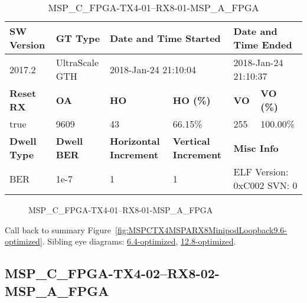 \begin{table}[h]
\centering
\caption{MSP\_C\_FPGA-TX4-01--RX8-01-MSP\_A\_FPGA}
\label{tab:MSPCFPGATX401RX801MSPAFPGA9.6-optimized}
\begin{tabular}{@{}|l|l|l|l|l|l|@{}}
\toprule
\textbf{SW Version}                & \textbf{GT Type}   & \multicolumn{2}{l|}{\textbf{Date and Time Started}}            & \multicolumn{2}{l|}{\textbf{Date and Time Ended}}        \\ \midrule
2017.2                       & UltraScale GTH          & \multicolumn{2}{l|}{2018-Jan-24 21:10:04}                   & \multicolumn{2}{l|}{2018-Jan-24 21:10:37}               \\ \midrule
\textbf{Reset RX}                  & \textbf{OA} & \textbf{HO}   & \textbf{HO (\%)} & \textbf{VO} & \textbf{VO (\%)} \\ \midrule
true & 9609        & 43          & 66.15\%        & 255        & 100.00\%       \\ \midrule
\textbf{Dwell Type}                & \textbf{Dwell BER} & \textbf{Horizontal Increment} & \textbf{Vertical Increment}    & \multicolumn{2}{l|}{\textbf{Misc Info}}                  \\ \midrule
BER                            & 1e-7        & 1        & 1           & \multicolumn{2}{l|}{ELF Version: 0xC002 SVN: 0}                         \\ \bottomrule
\end{tabular}
\end{table}

\begin{figure}[h]
\caption{MSP\_C\_FPGA-TX4-01--RX8-01-MSP\_A\_FPGA} \label{fig:MSPCFPGATX401RX801MSPAFPGA9.6-optimized}
\end{figure}

Call back to summary Figure~\ref{fig:MSPCTX4MSPARX8MinipodLoopback9.6-optimized}.
Sibling eye diagrams: \hyperref[sec:MSPCFPGATX401RX801MSPAFPGA6.4-optimized]{6.4-optimized}, \hyperref[sec:MSPCFPGATX401RX801MSPAFPGA12.8-optimized]{12.8-optimized}.

\clearpage
\newpage


\subsection{MSP\_C\_FPGA-TX4-02--RX8-02-MSP\_A\_FPGA}\label{sec:MSPCFPGATX402RX802MSPAFPGA9.6-optimized}

